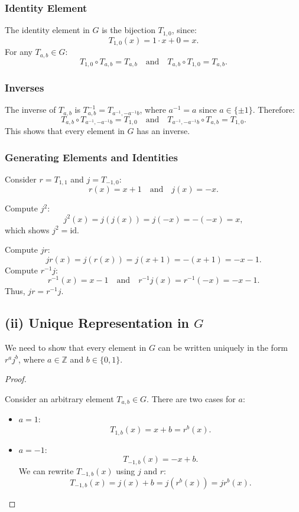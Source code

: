 \documentclass[12pt]{amsart}
\theoremstyle{definition}
\numberwithin{equation}{section}
\newcommand{\Z}{\mathbb{Z}}
\begin{document}
\begin{exercise}{6}
    \subsubsection*{Identity Element}
    The identity element in \(G\) is the bijection \(T_{1,0}\), since:
    \[
    T_{1,0}(x) = 1 \cdot x + 0 = x.
    \]
    For any \(T_{a,b} \in G\):
    \[
    T_{1,0} \circ T_{a,b} = T_{a,b} \quad \text{and} \quad T_{a,b} \circ T_{1,0} = T_{a,b}.
    \]

    \subsubsection*{Inverses}
    The inverse of \(T_{a,b}\) is \(T_{a,b}^{-1} = T_{a^{-1}, -a^{-1}b}\), where \(a^{-1} = a\) since \(a \in \{\pm 1\}\). Therefore:
    \[
    T_{a,b} \circ T_{a^{-1}, -a^{-1}b} = T_{1,0} \quad \text{and} \quad T_{a^{-1}, -a^{-1}b} \circ T_{a,b} = T_{1,0}.
    \]
    This shows that every element in \(G\) has an inverse.

    \subsubsection*{Generating Elements and Identities}
    Consider \(r = T_{1,1}\) and \(j = T_{-1,0}\):
    \[
    r(x) = x + 1 \quad \text{and} \quad j(x) = -x.
    \]

    Compute \(j^2\):
    \[
    j^2(x) = j(j(x)) = j(-x) = -(-x) = x,
    \]
    which shows \(j^2 = \text{id}\).

    Compute \(jr\):
    \[
    jr(x) = j(r(x)) = j(x + 1) = -(x + 1) = -x - 1.
    \]
    Compute \(r^{-1}j\):
    \[
    r^{-1}(x) = x - 1 \quad \text{and} \quad r^{-1}j(x) = r^{-1}(-x) = -x - 1.
    \]
    Thus, \(jr = r^{-1}j\).

    \subsection*{(ii) Unique Representation in \(G\)}

    We need to show that every element in \(G\) can be written uniquely in the form \(r^a j^b\), where \(a \in \Z\) and \(b \in \{0,1\}\).

    \begin{proof} \( \)
    
    Consider an arbitrary element \(T_{a,b} \in G\). There are two cases for \(a\):
    \begin{itemize}
        \item \(a = 1\):
        \[
        T_{1,b}(x) = x + b = r^b(x).
        \]
        \item \(a = -1\):
        \[
        T_{-1,b}(x) = -x + b.
        \]
        We can rewrite \(T_{-1,b}(x)\) using \(j\) and \(r\):
        \[
        T_{-1,b}(x) = j(x) + b = j(r^b(x)) = jr^b(x).
        \]
    \end{itemize}


\end{proof}
\end{exercise}
\end{document}
